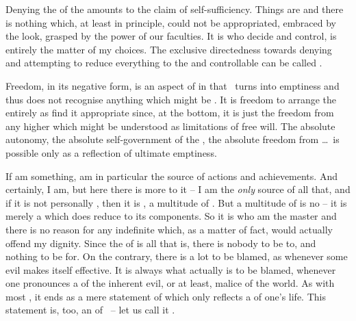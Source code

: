 \pa\label{pride} Denying the  of the  amounts to the
claim of self-sufficiency.  Things are  and there is nothing which,
at least in principle, could not be appropriated, embraced by the 
look, grasped by the  power of our faculties. It is  who decide
and control,  is entirely the matter of my choices. The exclusive
directedness towards  denying  and
attempting to reduce everything to the
 and controllable can be called .

Freedom, in its negative form, is an aspect of  in that \No\ turns
 into emptiness and thus does not recognise anything which might
be . It is freedom to arrange the  entirely as
 find it appropriate since, at the bottom, it is just the freedom from any
higher  which might be understood as limitations of  free
will. The absolute autonomy, the absolute self-government of the , the
absolute freedom from \ldots\ is possible only as a reflection of ultimate
emptiness.


\pa\label{ingratitude} If  am something,  am in particular the
source of  actions and achievements. And certainly, I am, but here there
is more to it -- I am the {\em only} source of all that, and if it is not
personally , then it is , a multitude of . But a multitude
of  is no  -- it is merely a  which does
reduce to its components. So it is  who am the master and there is no
reason for any indefinite  which, as a matter of fact, would
actually offend my dignity. Since the  of  is all
that is, there is nobody to be  to, and nothing to be 
for. On the contrary, there is a lot to be blamed, as whenever some evil makes
itself effective. It is always  what actually is to be blamed,
whenever one pronounces a  of the inherent evil, or at least,
malice of the world. As with most , it ends as a mere
statement of  which only reflects a  of one's
life. This statement is, too, an  of \No\ -- 
let us call it .


